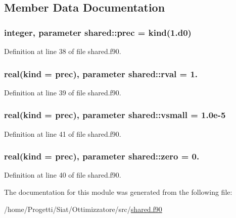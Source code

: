 \subsection{Member Data Documentation}
\hypertarget{classshared_a6d09f77f416c87d20c860fa9ee67f043}{
\subsubsection[{prec}]{\setlength{\rightskip}{0pt plus 5cm}integer, parameter shared\-::prec = kind(1.d0)}}\label{classshared_a6d09f77f416c87d20c860fa9ee67f043}


Definition at line 38 of file shared.\-f90.

\hypertarget{classshared_a1e6d2e57c52bc7d2d6e76ff50759bb36}{
\subsubsection[{rval}]{\setlength{\rightskip}{0pt plus 5cm}real(kind = {\bf prec}), parameter shared\-::rval = 1.}}\label{classshared_a1e6d2e57c52bc7d2d6e76ff50759bb36}


Definition at line 39 of file shared.\-f90.

\hypertarget{classshared_a783df489735fa6181ea5fae3d6be8726}{
\subsubsection[{vsmall}]{\setlength{\rightskip}{0pt plus 5cm}real(kind = {\bf prec}), parameter shared\-::vsmall = 1.\-0e-\/5}}\label{classshared_a783df489735fa6181ea5fae3d6be8726}


Definition at line 41 of file shared.\-f90.

\hypertarget{classshared_a12330d78292ab20be87d5801140eaef0}{
\subsubsection[{zero}]{\setlength{\rightskip}{0pt plus 5cm}real(kind = {\bf prec}), parameter shared\-::zero = 0.}}\label{classshared_a12330d78292ab20be87d5801140eaef0}


Definition at line 40 of file shared.\-f90.



The documentation for this module was generated from the following file\-:\begin{DoxyCompactItemize}
\item 
/home/\-Progetti/\-Siat/\-Ottimizzatore/src/\hyperlink{shared_8f90}{shared.\-f90}\end{DoxyCompactItemize}
